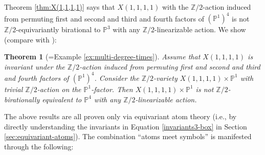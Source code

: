 \documentclass[12pt,a4paper]{amsart}
\newtheorem{Mtheorem}{Theorem}
\theoremstyle{definition}
\theoremstyle{remark}
\begin{document}
Theorem \ref{thm:X(1,1,1,1)} says that $X(1,1,1,1)$ with the $\mathbb Z/2$-action induced from permuting first and second and third and fourth factors of $(\mathbb P^1)^4$ is not $\mathbb Z/2$-equivariantly birational to $\mathbb P^3$ with any $\mathbb Z/2$-linearizable action. We show (compare with \cite[Proposition 5.3]{cheltsov2024equivariant}):
\begin{Mtheorem}[=Example \ref{ex:multi-degree-times}]
      Assume that \( X(1,1,1,1) \) is invariant under the  $\mathbb Z/2$-action induced from permuting first and second and third and fourth factors of $(\mathbb P^1)^4$. Consider the $\mathbb Z/2$-variety $X(1,1,1,1)\times \mathbb P^1$ with trivial $\mathbb Z/2$-action on the $\mathbb P^1$-factor. Then $X(1,1,1,1)\times \mathbb P^1$ is not $\mathbb Z/2$-birationally equivalent to $\mathbb P^4$ with \emph{any} $\mathbb Z/2$-linearizable action.
\end{Mtheorem}


The above results are all proven only via equivariant atom theory (i.e., by directly understanding the invariants in Equation \eqref{invariants3-box} in Section \ref{sec:equivariant-atoms}). The combination ``atoms meet symbols'' is manifested through the following:
\end{document}
